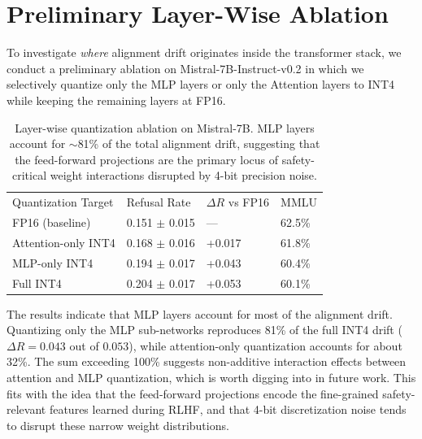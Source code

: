 \documentclass[11pt]{article}
\begin{document}



\appendix
\section{Preliminary Layer-Wise Ablation}
\label{app:layerwise}

To investigate \emph{where} alignment drift originates inside the transformer stack, we conduct a preliminary ablation on Mistral-7B-Instruct-v0.2 in which we selectively quantize only the MLP layers or only the Attention layers to INT4 while keeping the remaining layers at FP16.

\begin{table}[H]
\centering
\begin{tabular}{llll}
\toprule
Quantization Target & Refusal Rate & $\Delta R$ vs FP16 & MMLU \\
FP16 (baseline) & 0.151 $\pm$ 0.015 & --- & 62.5\% \\
\midrule
Attention-only INT4 & 0.168 $\pm$ 0.016 & +0.017 & 61.8\% \\
MLP-only INT4 & 0.194 $\pm$ 0.017 & +0.043 & 60.4\% \\
Full INT4 & 0.204 $\pm$ 0.017 & +0.053 & 60.1\% \\
\bottomrule
\end{tabular}
\caption{Layer-wise quantization ablation on Mistral-7B. MLP layers account for $\sim$81\% of the total alignment drift, suggesting that the feed-forward projections are the primary locus of safety-critical weight interactions disrupted by 4-bit precision noise.}
\label{tab:layerwise}
\end{table}

The results indicate that MLP layers account for most of the alignment drift. Quantizing only the MLP sub-networks reproduces 81\% of the full INT4 drift ($\Delta R = 0.043$ out of $0.053$), while attention-only quantization accounts for about 32\%. The sum exceeding 100\% suggests non-additive interaction effects between attention and MLP quantization, which is worth digging into in future work. This fits with the idea that the feed-forward projections encode the fine-grained safety-relevant features learned during RLHF, and that 4-bit discretization noise tends to disrupt these narrow weight distributions.
\end{document}
